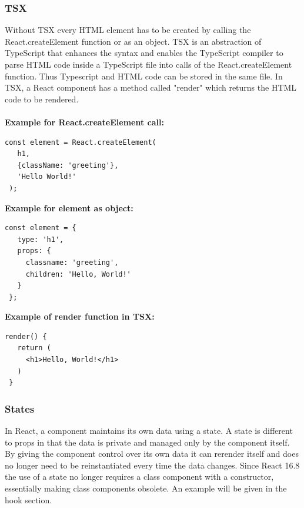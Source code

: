 \subsubsection{TSX}
Without TSX every HTML element has to be created by calling the React.createElement function or as an object. TSX is an abstraction of TypeScript that enhances the syntax and enables the TypeScript compiler to parse HTML code inside a TypeScript file into calls of the React.createElement function. Thus Typescript and HTML code can be stored in the same file. In TSX, a React component has a method called "render" which returns the HTML code to be rendered.\\\\
\textbf{Example for React.createElement call:}
\begin{Verbatim}[frame=single]
 const element = React.createElement(
   h1,
   {className: 'greeting'},
   'Hello World!'
 );
\end{Verbatim}
\pagebreak
\textbf{Example for element as object:}
\begin{Verbatim}[frame=single]
 const element = {
   type: 'h1',
   props: {
     classname: 'greeting',
     children: 'Hello, World!'
   }
 };
\end{Verbatim}
\textbf{Example of render function in TSX:}
\begin{Verbatim}[frame=single]
 render() {
   return (
     <h1>Hello, World!</h1>
   )    
 }
\end{Verbatim}
\subsubsection{States}
In React, a component maintains its own data using a state. A state is different to props in that the data is private and managed only by the component itself.
By giving the component control over its own data it can rerender itself and does no longer need to be reinstantiated every time the data changes. Since React 16.8 the use of a state no longer requires a class component with a constructor, essentially making class components obsolete. An example will be given in the hook section.\\

\pagebreak
